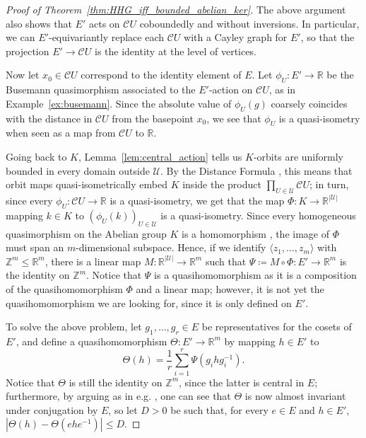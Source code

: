 \documentclass[svgnames]{amsart}
\theoremstyle{plain}
\theoremstyle{definition}
\newcommand{\cal}[1]{\mathcal{#1}}
\newcommand{\Z}{\mathbb{Z}}
\newcommand{\R}{\mathbb{R}}
\newcommand{\C}{\cal C}
\begin{document}
\begin{proof}[Proof of Theorem~\ref{thm:HHG_iff_bounded_abelian_ker}]
The above argument also shows that $E'$ acts on $\C U$ coboundedly and without inversions. In particular, we can $E'$-equivariantly replace each $\C U$ with a Cayley graph for $E'$, so that the projection $E'\to \C U$ is the identity at the level of vertices.

Now let $x_0\in \C U$ correspond to the identity element of $E$. Let $\phi_U\colon E'\to \R$ be the Busemann quasimorphism associated to the $E'$-action on $\C U$, as in Example~\ref{ex:busemann}. Since the absolute value of $\phi_U(g)$ coarsely coincides with the distance in $\C U$ from the basepoint $x_0$, we see that $\phi_U$ is a quasi-isometry when seen as a map from $\C U$ to $\R$.

Going back to $K$, Lemma~\ref{lem:central_action} tells us $K$-orbits are uniformly bounded in every domain outside $\cal U$. By the Distance Formula \cite[Theorem 4.5]{HHS_II}, this means that orbit maps quasi-isometrically embed $K$ inside the product $\prod_{U\in \cal U} \C U$; in turn, since every $\phi_U\colon \C U\to \R$ is a quasi-isometry, we get that the map $\Phi\colon K\to \R^{|\cal U|}$ mapping $k\in K$ to $(\phi_U(k))_{U\in \cal U}$ is a quasi-isometry. Since every homogeneous quasimorphism on the Abelian group $K$ is a homomorphism \cite[Corollary 2.12]{frigerio}, the image of $\Phi$ must span an $m$-dimensional subspace. Hence, if we identify $\langle z_1,\ldots, z_m\rangle$ with $\Z^m\le \R^m$, there is a linear map $M\colon \R^{|\cal U|}\to \R^m$ such that $\Psi\coloneq M\circ \Phi\colon E'\to \R^m$ is the identity on $\Z^m$. Notice that $\Psi$ is a quasihomomorphism as it is a composition of the quasihomomorphism $\Phi$ and a linear map; however, it is not yet the quasihomomorphism we are looking for, since it is only defined on $E'$.

To solve the above problem, let $g_1,\ldots,g_r\in E$ be representatives for the cosets of $E'$, and define a quasihomomorphism $\Theta\colon E'\to \R^m$ by mapping $h\in E'$ to
$$\Theta(h)=\frac{1}{r}\sum_{i=1}^r \Psi(g_ihg_i^{-1}).$$
Notice that $\Theta$ is still the identity on $\Z^m$, since the latter is central in $E$; furthermore, by arguing as in e.g. \cite[Lemma 3.4]{short_HHG:I}, one can see that $\Theta$ is now almost invariant under conjugation by $E$, so let $D>0$ be such that, for every $e\in E$ and $h\in E'$, $|\Theta(h)-\Theta(ehe^{-1})|\le D$. 


\end{proof}
\end{document}
